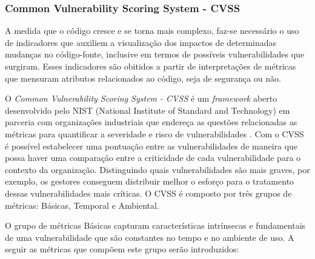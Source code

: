 %

%

\subsubsection{Common Vulnerability Scoring System - CVSS}

A medida que o código cresce e se torna mais complexo, faz-se necessário o uso de indicadores que auxiliem a visualização dos impactos de determinadas mudanças no código-fonte, inclusive em termos de possíveis vulnerabilidades que surgiram.
%
Esses indicadores são obitidos a partir de interpretações de métricas que mensuram atributos relacionados ao código, seja de segurança ou não. 

O \emph{Common Vulnerability Scoring System - CVSS} é um \emph{framework} aberto desenvolvido pelo NIST (National Institute of Standard and Technology) em parceria com organizações industriais que endereça as questões relacionadas as métricas para quantificar a severidade e risco de vulnerabilidades \cite{cvss2007}.
%
Com o CVSS é possível estabelecer uma pontuação entre as vulnerabilidades de maneira que possa haver uma comparação entre a criticidade de cada vulnerabilidade para o contexto da organização.
%
Distinguindo quais vulnerabilidades são mais graves, por exemplo, os gestores conseguem distribuir melhor o esforço para o tratamento dessas vulnerabilidades mais críticas. O CVSS é composto por três grupos de métricas: Básicas, Temporal e Ambiental.

%

O grupo de métricas Básicas capturam características intrínsecas e fundamentais de uma vulnerabilidade que são constantes no tempo e no ambiente de uso. A seguir as métricas que compõem este grupo serão introduzidos:

